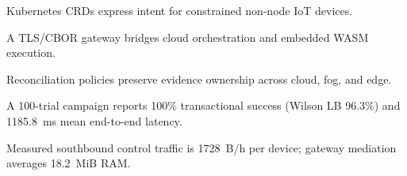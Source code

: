 \begin{highlights}
\item Kubernetes CRDs express intent for constrained non-node IoT devices.
\item A TLS/CBOR gateway bridges cloud orchestration and embedded WASM execution.
\item Reconciliation policies preserve evidence ownership across cloud, fog, and edge.
\item A 100-trial campaign reports 100\% transactional success (Wilson LB 96.3\%) and 1185.8~ms mean end-to-end latency.
\item Measured southbound control traffic is 1728~B/h per device; gateway mediation averages 18.2~MiB RAM.
\end{highlights}